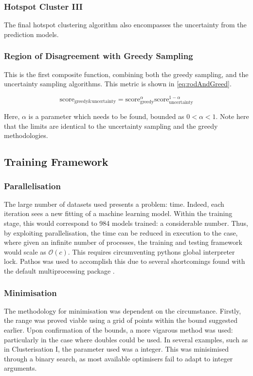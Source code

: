     \subsubsection{Hotspot Cluster III}
    The final hotspot clustering algorithm also encompasses the uncertainty from the prediction models.

    \subsubsection{Region of Disagreement with Greedy Sampling}
    This is the first composite function, combining both the greedy sampling, and the uncertainty sampling algorithms. This metric is shown in \ref{eq:rodAndGreed}.

    \begin{equation}
        \label{eq:rodAndGreed}
        {\mathrm{score}_\mathrm{greedy\&uncertainty}=\mathrm{score}_\mathrm{greedy}^{\alpha}\mathrm{score}_\mathrm{uncertainty}^{1-\alpha}}
    \end{equation}

    Here, $\alpha$ is a parameter which needs to be found, bounded as $0<\alpha{}<1$. Note here that the limits are identical to the uncertainty sampling and the greedy methodologies.

    \subsection{Training Framework}
    \blindtext[1]
    \subsubsection{Parallelisation}
    The large number of datasets used presents a problem: time. Indeed, each iteration sees a new fitting of a machine learning model. Within the training stage, this would correspond to 984 models trained: a considerable number. Thus, by exploiting parallelisation, the time can be reduced in execution to the case, where given an infinite number of processes, the training and testing framework would scale as $\mathcal{O}(c)$. This requires circumventing pythons global interpreter lock. Pathos was used to accomplish this due to several shortcomings found with the default multiprocessing package \cite{pathos1,pathos2}.
\subsubsection{Minimisation}
The methodology for minimisation was dependent on the circumstance. Firstly, the range was proved viable using a grid of points within the bound suggested earlier. Upon confirmation of the bounds, a more vigarous method was used: particularly in the case where doubles could be used. In several examples, such as in Clusterisation I, the parameter used was a integer. This was minisimised through a binary search, as most available optimisers fail to adapt to integer arguments.
\blindtext[1]